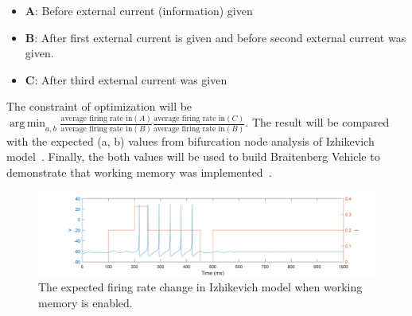 \documentclass[paper=a4, fontsize=11pt]{article} %
\numberwithin{equation}{section} %
\numberwithin{table}{section} %
\DeclareMathOperator*{\argminA}{arg\,min} %
\begin{document}
\begin{itemize}
\item \textbf{A}: Before external current (information) given
\item \textbf{B}: After first external current is given and before second external current was given.
\item \textbf{C}: After third external current was given
\end{itemize}

The constraint of optimization will be $ \argminA_{a, b} \frac{\textrm{average firing rate in}(A)}{\textrm{average firing rate in}(B)} \frac{\textrm{average firing rate in}(C)}{\textrm{average firing rate in}(B)}$. The result will be compared with the expected (a, b) values from bifurcation node analysis of Izhikevich model~\cite{izhikevich2003simple, moehlis2008dynamical}. Finally, the both values will be used to build Braitenberg Vehicle to demonstrate that working memory was implemented~\cite{braitenberg1986vehicles, french2005introducing}.

\begin{figure}[H]
\centering
  \includegraphics[width = 150mm, scale = 0.8]{./fig/experiment.png}
  \caption{The expected firing rate change in Izhikevich model when working memory is enabled.}
  \label{fig1}
\end{figure}

{}

\end{document}
